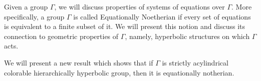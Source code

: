 \documentclass{article}
\begin{document}
Given a group $\Gamma$, we will discuss properties of systems of equations over $\Gamma$. More specifically, a group $\Gamma$ is called Equationally Noetherian if every set of equations is equivalent to a finite subset of it. We will present this notion and discuss its connection to geometric properties of $\Gamma$, namely, hyperbolic structures on which $\Gamma$ acts.

We will present a new result which shows that if $\Gamma$ is strictly acylindrical colorable hierarchically hyperbolic group, then it is equationally notherian.
\end{document}

